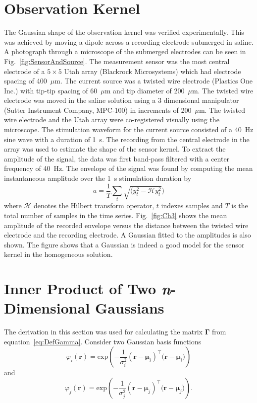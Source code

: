 \documentclass[review,authoryear,3p]{elsarticle}
\begin{document}
\section{Observation Kernel}\label{App:ObsKernelExperiment}
The Gaussian shape of the observation kernel was verified experimentally. This was achieved by moving a dipole across a recording electrode submerged in saline. A photograph through a microscope of the submerged electrodes can be seen in Fig.~\ref{fig:SensorAndSource}. The measurement sensor was the most central electrode of a $5\times5$ Utah array (Blackrock Microsystems) which had electrode spacing of 400~$\mu$m. The current source was a twisted wire electrode (Plastics One Inc.) with tip-tip spacing of 60~$\mu$m and tip diameter of 200~$\mu$m. The twisted wire electrode was moved in the saline solution using a 3 dimensional manipulator (Sutter Instrument Company, MPC-100) in increments of 200~$\mu$m. The twisted wire electrode and the Utah array were co-registered visually using the microscope.
The stimulation waveform for the current source consisted of a 40~Hz sine wave with a duration of 1~s. The recording from the central electrode in the array was used to estimate the shape of the sensor kernel. To extract the amplitude of the signal, the data was first band-pass filtered with a center frequency of 40~Hz. The envelope of the signal was found by computing the mean instantaneous amplitude over the 1~s stimulation duration by
\begin{equation}
	a = \frac{1}{T}\sum_t{\sqrt{(y_t^2-\mathcal{H}y_t^2})}
\end{equation}
where $\mathcal{H}$ denotes the Hilbert transform operator, $t$ indexes samples and $T$ is the total number of samples in the time series. Fig.~\ref{fig:Ch3} shows the mean amplitude of the recorded envelope versus the distance between the twisted wire electrode and the recording electrode. A Gaussian fitted to the amplitudes is also shown. The figure shows that a Gaussian is indeed a good model for the sensor kernel in the homogeneous solution.

\section{Inner Product of Two \emph{n}-Dimensional Gaussians}\label{App:InnerProdOfGaussians}
The derivation in this section was used for calculating the matrix $\mathbf \Gamma$ from equation~\ref{eq:DefGamma}. Consider two Gaussian basis functions
\begin{equation}\label{eq:n_dimensional_Gaussian1}
 \varphi_i(\mathbf r)=\mathrm{exp}\left({-\frac{1}{\sigma_i^2} (\mathbf r-\boldsymbol \mu_i)^\top(\mathbf r-\boldsymbol \mu_i})\right)
\end{equation}
and 
\begin{equation}\label{eq:n_dimensional_Gaussian2}
\varphi_j(\mathbf r)=\mathrm{exp}\left({-\frac{1}{\sigma_j^2} (\mathbf r-\boldsymbol \mu_j)^\top(\mathbf r-\boldsymbol \mu_j})\right).
\end{equation}
\end{document}
